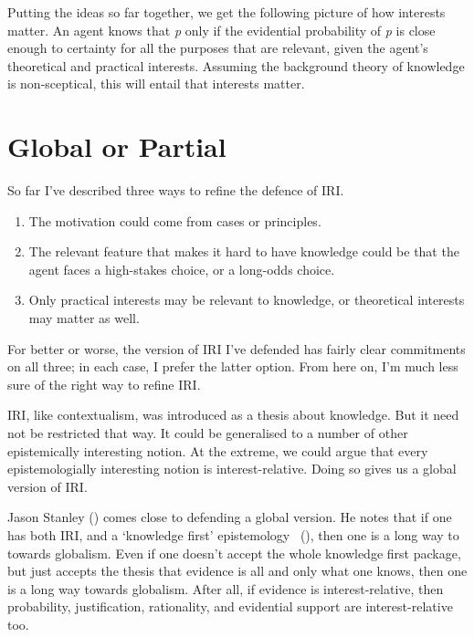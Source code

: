 \documentclass[
  11pt,
  letterpaper,
  DIV=11,
  numbers=noendperiod,
  twoside]{scrartcl}
\providecommand{\tightlist}{%
  \setlength{\itemsep}{0pt}\setlength{\parskip}{0pt}}
\begin{document}
Putting the ideas so far together, we get the following picture of how
interests matter. An agent knows that \emph{p} only if the evidential
probability of \emph{p} is close enough to certainty for all the
purposes that are relevant, given the agent's theoretical and practical
interests. Assuming the background theory of knowledge is non-sceptical,
this will entail that interests matter.

\section{Global or Partial}\label{globalorpartial}

So far I've described three ways to refine the defence of IRI.

\begin{enumerate}
\def\labelenumi{\arabic{enumi}.}
\tightlist
\item
  The motivation could come from cases or principles.
\item
  The relevant feature that makes it hard to have knowledge could be
  that the agent faces a high-stakes choice, or a long-odds choice.
\item
  Only practical interests may be relevant to knowledge, or theoretical
  interests may matter as well.
\end{enumerate}

For better or worse, the version of IRI I've defended has fairly clear
commitments on all three; in each case, I prefer the latter option. From
here on, I'm much less sure of the right way to refine IRI.

IRI, like contextualism, was introduced as a thesis about knowledge. But
it need not be restricted that way. It could be generalised to a number
of other epistemically interesting notion. At the extreme, we could
argue that every epistemologially interesting notion is
interest-relative. Doing so gives us a global version of IRI.

Jason Stanley () comes close to
defending a global version. He notes that if one has both IRI, and a
`knowledge first' epistemology
~(), then one is a long
way to towards globalism. Even if one doesn't accept the whole knowledge
first package, but just accepts the thesis that evidence is all and only
what one knows, then one is a long way towards globalism. After all, if
evidence is interest-relative, then probability, justification,
rationality, and evidential support are interest-relative too.
\end{document}
